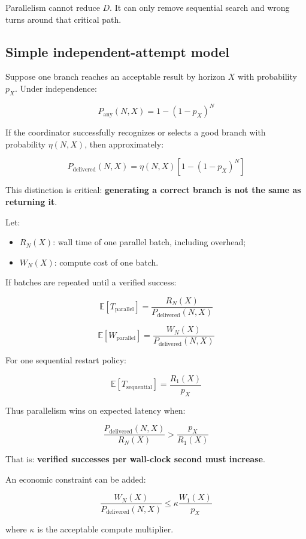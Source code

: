 \documentclass[
  letterpaper,
]{article}
\providecommand{\tightlist}{%
  \setlength{\itemsep}{0pt}\setlength{\parskip}{0pt}}
\begin{document}
Parallelism cannot reduce \(D\). It can only remove sequential search and wrong turns around that critical path.

\subsection{Simple independent-attempt model}\label{simple-independent-attempt-model}

Suppose one branch reaches an acceptable result by horizon \(X\) with probability \(p_X\). Under independence:

\[
P_{\text{any}}(N,X)=1-(1-p_X)^N
\]

If the coordinator successfully recognizes or selects a good branch with probability \(\eta(N,X)\), then approximately:

\[
P_{\text{delivered}}(N,X)
=
\eta(N,X)\left[1-(1-p_X)^N\right]
\]

This distinction is critical: \textbf{generating a correct branch is not the same as returning it}.

Let:

\begin{itemize}
\tightlist
\item
  \(R_N(X)\): wall time of one parallel batch, including overhead;
\item
  \(W_N(X)\): compute cost of one batch.
\end{itemize}

If batches are repeated until a verified success:

\[
\mathbb E[T_{\text{parallel}}]
=
\frac{R_N(X)}{P_{\text{delivered}}(N,X)}
\]

\[
\mathbb E[W_{\text{parallel}}]
=
\frac{W_N(X)}{P_{\text{delivered}}(N,X)}
\]

For one sequential restart policy:

\[
\mathbb E[T_{\text{sequential}}]
=
\frac{R_1(X)}{p_X}
\]

Thus parallelism wins on expected latency when:

\[
\boxed{
\frac{P_{\text{delivered}}(N,X)}{R_N(X)}
>
\frac{p_X}{R_1(X)}
}
\]

That is: \textbf{verified successes per wall-clock second must increase}.

An economic constraint can be added:

\[
\boxed{
\frac{W_N(X)}{P_{\text{delivered}}(N,X)}
\le
\kappa\frac{W_1(X)}{p_X}
}
\]

where \(\kappa\) is the acceptable compute multiplier.
\end{document}
